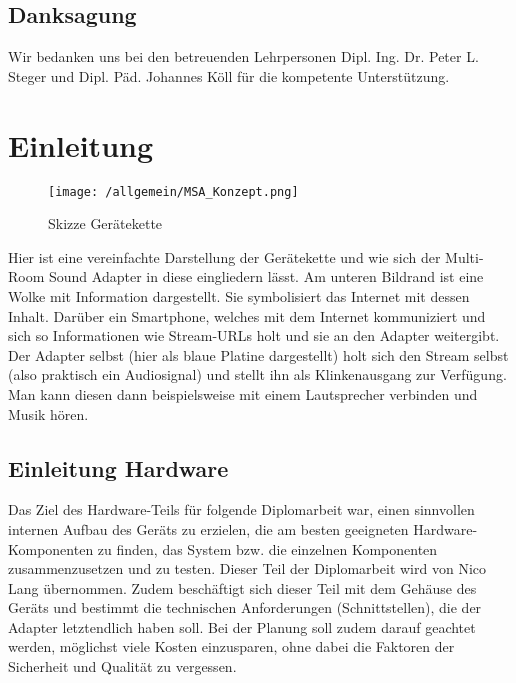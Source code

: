 \documentclass[11pt, twoside]{article}
\begin{document}
\subsection{Danksagung}
Wir bedanken uns bei den betreuenden Lehrpersonen Dipl. Ing. Dr. Peter L. Steger und Dipl. Päd. Johannes Köll für die kompetente Unterstützung.

\pagebreak
\tableofcontents
\pagebreak

\pagestyle{fancy} %
\setcounter{page}{1} %

\section{Einleitung}
\begin{figure}[H]
\begin{center}
\texttt{[image: /allgemein/MSA\_Konzept.png]}
\caption{Skizze Gerätekette}
\end{center}
\end{figure}
Hier ist eine vereinfachte Darstellung der Gerätekette und wie sich der Multi-Room Sound Adapter in diese eingliedern lässt.\newline
Am unteren Bildrand ist eine Wolke mit Information dargestellt. Sie symbolisiert das Internet mit dessen Inhalt. Darüber ein Smartphone, welches mit dem Internet kommuniziert und sich so Informationen wie Stream-URLs holt und sie an den Adapter weitergibt. Der Adapter selbst (hier als blaue Platine dargestellt) holt sich den Stream selbst (also praktisch ein Audiosignal) und stellt ihn als Klinkenausgang zur Verfügung. Man kann diesen dann beispielsweise mit einem Lautsprecher verbinden und Musik hören.

\subsection{Einleitung Hardware}
Das Ziel des Hardware-Teils für folgende Diplomarbeit war, einen sinnvollen internen Aufbau des Geräts zu erzielen, die am besten geeigneten Hardware-Komponenten zu finden, das System bzw. die einzelnen Komponenten zusammenzusetzen und zu testen. Dieser Teil der Diplomarbeit wird von Nico Lang übernommen.
Zudem beschäftigt sich dieser Teil mit dem Gehäuse des Geräts und bestimmt die technischen Anforderungen (Schnittstellen), die der Adapter letztendlich haben soll. 
Bei der Planung soll zudem darauf geachtet werden, möglichst viele Kosten einzusparen, ohne dabei die Faktoren der Sicherheit und Qualität zu vergessen.
\end{document}
